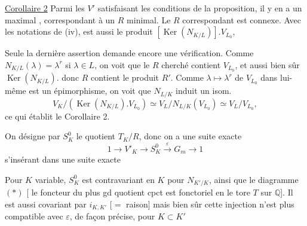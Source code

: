 \uline{Corollaire 2} Parmi les $V'$ satisfaisant les conditions de la proposition,
il y en a un maximal 
, correspondant à un $R$ minimal.
Le $R$ correspondant est connexe. Avec les notations de (iv),
est aussi le produit $[\operatorname{Ker}(N_{K/L})].V_{L_0}$,

Seule la dernière assertion demande encore une vérification.
Comme $N_{K/L}(\lambda)=\lambda^r$ si $\lambda\in L$, on voit que le $R$ cherché
contient $V_{L_0}$, et aussi bien sûr $\operatorname{Ker}(N_{K/L})$.
 donc $R$ contient le produit $R'$.
 Comme $\lambda\mapsto\lambda^r$ de $V_{L_0}$ dans lui-même est un épimorphisme,
on voit que $N_{L/K}$ induit un isom.
\[
V_K/(\operatorname{Ker}(N_{K/L}).V_{L_0})\simeq
V_L/N_{L/K}(V_{L_0})\simeq V_L/V_{L_0},
\]
ce qui établit le Corollaire 2.

On désigne par $S_K^0$ le quotient $T_K/R$, donc on a une suite exacte
\margin{\deleted{\unsure{$(*)$}}}
\[
1\longrightarrow V'_K\longrightarrow S_K^0\xrightarrow{\varepsilon}G_m\longrightarrow1
\]
s'insérant dans une suite exacte

Pour $K$ variable, $S_K^0$ est contravariant en $K$ pour $N_{K'/K}$,
ainsi que le diagramme $(*)$ [ le foncteur du plus gd
quotient cpct est fonctoriel en le tore $T$ sur $\mathbb Q$].
Il est aussi covariant \deleted{\unsure{-}} par $i_{K,K'}$ [$=$ raison]
mais bien sûr cette injection n'est plus compatible avec $\varepsilon$,
 de façon précise, pour $K\subset K'$
